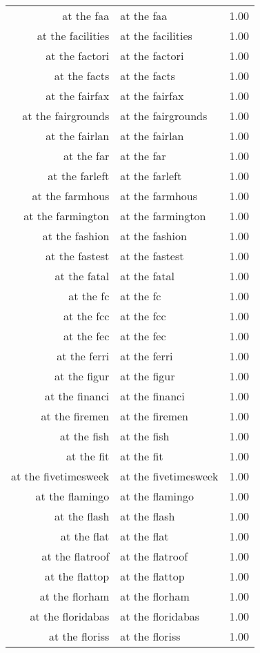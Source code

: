 \begin{table}[ht]
\begin{tabular}{rlr}
  at the faa & at the faa & 1.00 \\ 
  at the facilities & at the facilities & 1.00 \\ 
  at the factori & at the factori & 1.00 \\ 
  at the facts & at the facts & 1.00 \\ 
  at the fairfax & at the fairfax & 1.00 \\ 
  at the fairgrounds & at the fairgrounds & 1.00 \\ 
  at the fairlan & at the fairlan & 1.00 \\ 
  at the far & at the far & 1.00 \\ 
  at the farleft & at the farleft & 1.00 \\ 
  at the farmhous & at the farmhous & 1.00 \\ 
  at the farmington & at the farmington & 1.00 \\ 
  at the fashion & at the fashion & 1.00 \\ 
  at the fastest & at the fastest & 1.00 \\ 
  at the fatal & at the fatal & 1.00 \\ 
  at the fc & at the fc & 1.00 \\ 
  at the fcc & at the fcc & 1.00 \\ 
  at the fec & at the fec & 1.00 \\ 
  at the ferri & at the ferri & 1.00 \\ 
  at the figur & at the figur & 1.00 \\ 
  at the financi & at the financi & 1.00 \\ 
  at the firemen & at the firemen & 1.00 \\ 
  at the fish & at the fish & 1.00 \\ 
  at the fit & at the fit & 1.00 \\ 
  at the fivetimesweek & at the fivetimesweek & 1.00 \\ 
  at the flamingo & at the flamingo & 1.00 \\ 
  at the flash & at the flash & 1.00 \\ 
  at the flat & at the flat & 1.00 \\ 
  at the flatroof & at the flatroof & 1.00 \\ 
  at the flattop & at the flattop & 1.00 \\ 
  at the florham & at the florham & 1.00 \\ 
  at the floridabas & at the floridabas & 1.00 \\ 
  at the floriss & at the floriss & 1.00 \\ 

\end{tabular}
\end{table}
